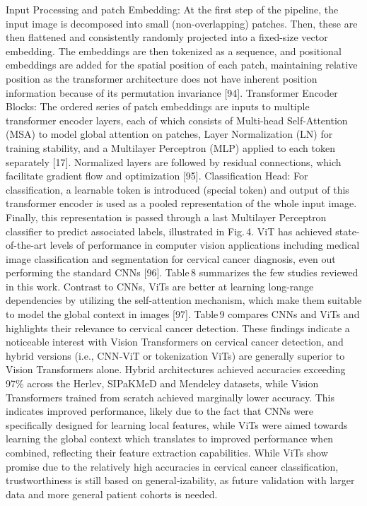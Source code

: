 \documentclass{svjour3}
\begin{document}
Input Processing and patch Embedding: At the first step of the pipeline, the input image is decomposed into small (non-overlapping) patches. Then, these are then flattened and consistently randomly projected into a fixed-size vector embedding. The embeddings are then tokenized as a sequence, and positional embeddings are added for the spatial position of each patch, maintaining relative position as the transformer architecture does not have inherent position information because of its permutation invariance [94].
Transformer Encoder Blocks: The ordered series of patch embeddings are inputs to multiple transformer encoder layers, each of which consists of Multi-head Self-Attention (MSA) to model global attention on patches, Layer Normalization (LN) for training stability, and a Multilayer Perceptron (MLP) applied to each token separately [17]. Normalized layers are followed by residual connections, which facilitate gradient flow and optimization [95].
Classification Head: For classification, a learnable token is introduced (special token) and output of this transformer encoder is used as a pooled representation of the whole input image. Finally, this representation is passed through a last Multilayer Perceptron classifier to predict associated labels, illustrated in Fig. 4.
ViT has achieved state-of-the-art levels of performance in computer vision applications including medical image classification and segmentation for cervical cancer diagnosis, even out performing the standard CNNs [96]. Table 8 summarizes the few studies reviewed in this work. Contrast to CNNs, ViTs are better at learning long-range dependencies by utilizing the self-attention mechanism, which make them suitable to model the global context in images [97]. Table 9 compares CNNs and ViTs and highlights their relevance to cervical cancer detection.
These findings indicate a noticeable interest with Vision Transformers on cervical cancer detection, and hybrid versions (i.e., CNN‑ViT or tokenization ViTs) are generally superior to Vision Transformers alone. Hybrid architectures achieved accuracies exceeding 97\% across the Herlev, SIPaKMeD and Mendeley datasets, while Vision Transformers trained from scratch achieved marginally lower accuracy. This indicates improved performance, likely due to the fact that CNNs were specifically designed for learning local features, while ViTs were aimed towards learning the global context which translates to improved performance when combined, reflecting their feature extraction capabilities. While ViTs show promise due to the relatively high accuracies in cervical cancer classification, trustworthiness is still based on general‑izability, as future validation with larger data and more general patient cohorts is needed.
\end{document}
